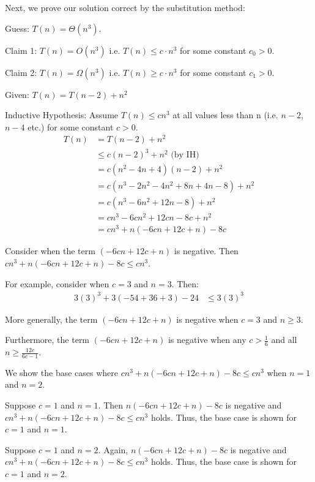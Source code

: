 \documentclass[a4paper]{report}
\begin{document}
\begin{enumerate}
  
      Next, we prove our solution correct by the substitution method:

      Guess: $T(n) = \Theta(n^3)$.

      Claim 1: $T(n) = O(n^3)$ i.e. $T(n) \leq c \cdot n^3$ for some constant $c_{0}>0$.

      Claim 2: $T(n) = \Omega(n^3)$ i.e. $T(n) \geq c \cdot n^3$ for some constant $c_{1}>0$.

      Given: $T(n) = T(n-2) + n^2$

      Inductive Hypothesis: Assume $T(n) \leq cn^3$ at all values less than n (i.e. $n-2$, $n-4$ etc.) for some constant $c>0$.
      \begin{align}
        T(n) &= T(n-2) + n^2  \\
        &\leq c(n-2)^3 + n^2  \text{         (by IH)}\\
        &= c(n^2 - 4n + 4)(n-2) + n^2 \\
        &= c(n^3 - 2n^2 - 4n^2 + 8n + 4n - 8) + n^2 \\
        &= c(n^3 - 6n^2 + 12n - 8) + n^2  \\
        &= cn^3 - 6cn^2 + 12cn - 8c + n^2  \\
        &= cn^3 + n(-6cn + 12c + n) - 8c   
      \end{align}

      Consider when the term $(-6cn + 12c + n)$ is negative. Then
      $cn^3 + n(-6cn + 12c + n) - 8c \leq cn^3$.

      For example, consider when $c=3$ and $n = 3$. Then:
      \begin{align}
        3(3)^3 + 3(-54 + 36 + 3) - 24 &\leq 3(3)^3
      \end{align}

      More generally, the term $(-6cn + 12c +n)$ is negative when 
      $c=3$ and $n \geq 3$.

      Furthermore, the term $(-6cn + 12c +n)$ is negative when  
      any $c>\frac{1}{6}$ and all $n \geq \frac{12c}{6c-1}$. 

      We show the base cases where 
      $cn^3 + n(-6cn + 12c + n) - 8c \leq cn^3$ when $n=1$ and $n=2$.

      Suppose $c=1$ and $n=1$. Then $n(-6cn + 12c + n) - 8c$ is negative and 
      $cn^3 + n(-6cn + 12c + n) - 8c \leq cn^3$ holds. Thus, the base case
      is shown for $c=1$ and $n=1$.

      Suppose $c=1$ and $n=2$. Again, $n(-6cn + 12c + n) - 8c$ is negative and 
      $cn^3 + n(-6cn + 12c + n) - 8c \leq cn^3$ holds. Thus, the base case
      is shown for $c=1$ and $n=2$.


\end{enumerate}
\end{document}
